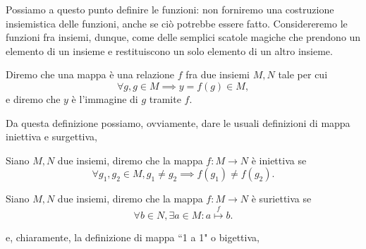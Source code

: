 Possiamo a questo punto definire le funzioni: non forniremo una costruzione insiemistica delle funzioni, anche se ciò potrebbe essere fatto. Considereremo le funzioni fra insiemi, dunque,
come delle semplici scatole magiche che prendono un elemento di un insieme e restituiscono un solo elemento di un altro insieme.

\begin{definition}[mappe]
	Diremo che una mappa è una relazione $f$ fra due insiemi $M, N$ tale per cui
	\begin{equation}
		\forall g, g \in M \implies y=f(g) \in M,
	\end{equation}
	e diremo che $y$ è l'immagine di $g$ tramite $f$.
\end{definition}

Da questa definizione possiamo, ovviamente, dare le usuali definizioni di mappa iniettiva e surgettiva,

\begin{definition}
	Siano $M, N$ due insiemi, diremo che la mappa $f: M \to N$ è iniettiva se
	\begin{equation}
		\forall g_1, g_2 \in M, g_1 \neq g_2 \implies f(g_1) \neq f(g_2).
	\end{equation}
\end{definition}

\begin{definition}
	Siano $M, N$ due insiemi, diremo che la mappa $f: M \to N$ è suriettiva se
	\begin{equation}
		\forall b \in N, \exists a \in M : a \stackrel{f}{\mapsto} b. 
	\end{equation}
\end{definition}

e, chiaramente, la definizione di mappa ``1 a 1" o bigettiva,

